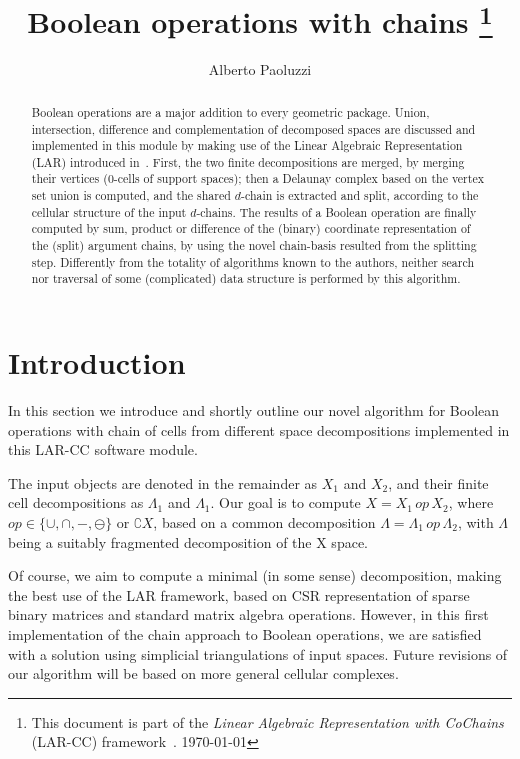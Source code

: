 \documentclass[11pt,oneside]{article}	%
\title{Boolean operations with chains
\footnote{This document is part of the \emph{Linear Algebraic Representation with CoChains} (LAR-CC) framework~\cite{cclar-proj:2013:00}. \today}
}
\author{Alberto Paoluzzi}
\begin{document}
\maketitle

\begin{abstract}
Boolean operations are a major addition to every geometric package. Union, intersection, difference and complementation of decomposed spaces are discussed and implemented in this module by making use of the Linear Algebraic Representation (LAR) introduced in~\cite{Dicarlo:2014:TNL:2543138.2543294}. First, the two finite decompositions are merged, by merging their vertices (0-cells of support spaces); then a Delaunay complex based on the vertex set union is computed, and the shared $d$-chain is extracted and split, according to the cellular structure of the input $d$-chains. The results of a Boolean operation are finally computed by sum, product or difference of the (binary) coordinate representation of the (split) argument chains, by using the novel chain-basis resulted from the splitting step. Differently from the totality of algorithms known to the authors, neither search nor traversal of some (complicated) data structure is performed by this algorithm. 
\end{abstract}

\tableofcontents
\section{Introduction}

In this section we introduce and shortly outline our novel algorithm for Boolean operations with chain of cells from different space decompositions implemented in this LAR-CC software module.

The input objects are denoted in the remainder as $X_1$ and $X_2$, and their finite cell decompositions as $\Lambda_1$ and $\Lambda_1$. Our goal is to compute $X = X_1\, op\, X_2$, where $op \in \{\cup ,\cap , - ,\ominus \}$ or $\complement X$, based on a common decomposition $\Lambda = \Lambda_1\, op\, \Lambda_2$, with $\Lambda$ being a suitably fragmented decomposition of the X space.

Of course, we aim to compute a minimal (in some sense) decomposition, making the best use of the LAR framework, based on CSR representation of sparse binary matrices and standard matrix algebra operations.
However, in this first implementation of the chain approach to Boolean operations, we are satisfied with a solution using simplicial triangulations of input spaces. Future revisions of our algorithm will be based on more general cellular complexes.
\end{document}
